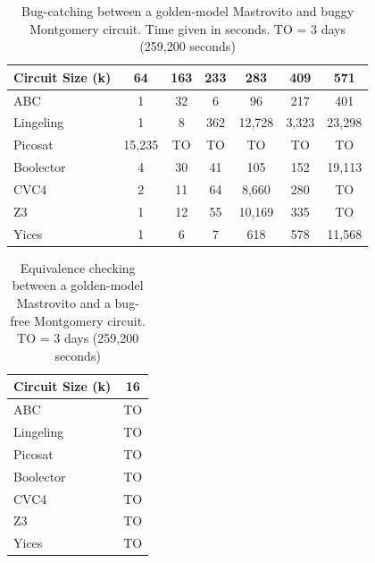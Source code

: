 \begin{table}[!hbt]
\begin{center}
{\small
\caption{Bug-catching between a golden-model Mastrovito and buggy Montgomery circuit. 
Time given in seconds. TO = 3 days (259,200 seconds)}
\label{tab:satsmtbugcatch}
\begin{tabular}{|l|c|c|c|c|c|c|} 
\hline
Circuit Size (k) &  64  &    163 &      233 &     283 &     409 &    571  \\
\hline
ABC              &  1     &    32  &     6    &   96    &     217 &    401  \\
\hline
Lingeling        &  1     &     8  &    362   & 12,728  &   3,323 & 23,298  \\
\hline
Picosat          & 15,235 &    TO  &    TO    &    TO   &     TO  &   TO    \\
\hline
Boolector        &  4     &    30  &    41    &   105   &    152  & 19,113  \\
\hline
CVC4             &  2     &    11  &    64    &  8,660  &    280  &    TO   \\
\hline
Z3               &  1     &    12  &    55    & 10,169  &    335  &    TO   \\
\hline
Yices            &  1     &     6  &     7    &   618   &    578  & 11,568  \\
\hline
\end{tabular}
}
\end{center}
\vspace{-0.2in}
\end{table}

\begin{table}[!hbt]
\begin{center}
{\small
\caption{Equivalence checking between a golden-model Mastrovito and a bug-free Montgomery circuit. 
TO = 3 days (259,200 seconds)}
\label{tab:equivCheckFail}
\begin{tabular}{|l|c|} 
\hline
Circuit Size (k) &  16  \\
\hline
ABC              &  TO \\
\hline
Lingeling        &  TO \\
\hline
Picosat          &  TO \\
\hline
Boolector        &  TO \\
\hline
CVC4             &  TO \\
\hline
Z3               &  TO \\
\hline
Yices            &  TO \\
\hline
\end{tabular}
}
\end{center}
\vspace{-0.2in}
\end{table}

